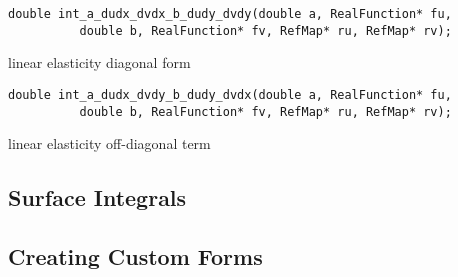 \begin{lstlisting}
double int_a_dudx_dvdx_b_dudy_dvdy(double a, RealFunction* fu, 
          double b, RealFunction* fv, RefMap* ru, RefMap* rv);
\end{lstlisting}
     {linear elasticity diagonal form}


\begin{lstlisting}
double int_a_dudx_dvdy_b_dudy_dvdx(double a, RealFunction* fu,
          double b, RealFunction* fv, RefMap* ru, RefMap* rv);
\end{lstlisting}
     {linear elasticity off-diagonal term}






\subsection{Surface Integrals}
\label{sec:surfint}


\subsection{Creating Custom Forms}
